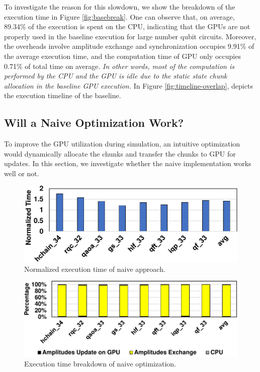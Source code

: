 To investigate the reason for this slowdown, we show the breakdown of the execution time in Figure \ref{fig:basebreak}. One can observe that, on average, 89.34\%  of the execution is spent on the CPU, indicating that the GPUs are not properly used in the baseline execution for large number qubit circuits. Moreover, the overheads involve amplitude exchange and synchronization occupies 9.91\% of the average execution time, and the computation time of GPU only occupies 0.71\% of total time on average. \emph{In other words, most of the computation is performed by the CPU and the GPU is idle due to the static state chunk allocation in the baseline GPU execution.} In Figure \ref{fig:timeline-overlap},  depicts the execution timeline of the baseline.


\subsection{Will a Naive Optimization Work?}
\label{sec:naive}
To improve the GPU utilization during simulation, an intuitive optimization would dynamically allocate the chunks and transfer the chunks to GPU for updates. In this section, we investigate whether the naive implementation works well or not.
\begin{figure}[!h]
    \centering
    \includegraphics[width=\textwidth]{Images/appendix2/section-3/naive-base.pdf}
    \caption{Normalized execution time of naive approach.}
    \label{fig:naivebase}
    \vspace{-5pt}
\end{figure}

\begin{figure}[!h]
\includegraphics[width=\textwidth]{Images/appendix2/section-3/naive.pdf}
\centering
\caption{Execution time breakdown of naive optimization.} 
\label{fig:naivebreak}
\end{figure}

